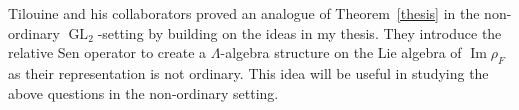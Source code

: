 \documentclass[12pt]{article}
\theoremstyle{definition}
\DeclareMathOperator{\GL}{GL}
\DeclareMathOperator{\im}{Im}
\begin{document}
Tilouine and his collaborators proved an analogue of Theorem~\ref{thesis} in the non-ordinary $\GL_2$-setting \cite{CIT15} by building on the ideas in my thesis.  They introduce the relative Sen operator to create a $\Lambda$-algebra structure on the Lie algebra of $\im \rho_F$ as their representation is not ordinary.  This idea will be useful in studying the above questions in the non-ordinary setting. 

{}

\end{document}
